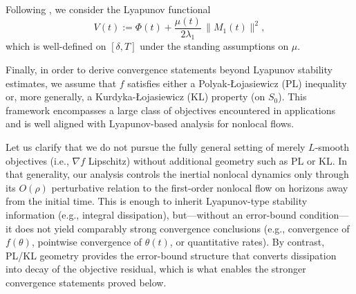 \documentclass{article} %
\begin{document}
Following \cite{JMLRBelotto}, we consider the Lyapunov functional
\begin{equation}\label{eq:Lyap-V}
V(t):=\Phi(t)+\frac{\mu(t)}{2\lambda_1}\,\|M_1(t)\|^2,
\end{equation}
which is well-defined on $[\delta,T]$ under the standing assumptions on $\mu$.

Finally, in order to derive convergence statements beyond Lyapunov stability estimates, we assume that $f$ satisfies either a Polyak-{\L}ojasiewicz (PL) inequality or, more generally, a Kurdyka-{\L}ojasiewicz (KL) property (on $S_0$). This framework encompasses a large class of objectives encountered in applications and is well aligned with Lyapunov-based analysis for nonlocal flows.

Let us clarify that we do not pursue the fully general setting of merely $L$-smooth objectives (i.e., $\nabla f$ Lipschitz) without additional geometry such as PL or KL. In that generality, our analysis controls the inertial nonlocal dynamics only through its $O(\rho)$ perturbative relation to the first-order nonlocal flow on horizons away from the initial time. This is enough to inherit Lyapunov-type stability information (e.g., integral dissipation), but---without an error-bound condition---it does not yield comparably strong convergence conclusions (e.g., convergence of $f(\theta)$, pointwise convergence of $\theta(t)$, or quantitative rates). By contrast, PL/KL geometry provides the error-bound structure that converts dissipation into decay of the objective residual, which is what enables the stronger convergence statements proved below.
\end{document}

